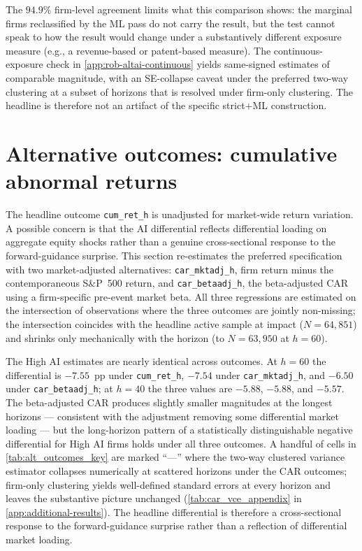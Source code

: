The $94.9\%$ firm-level agreement limits what this comparison shows:
the marginal firms reclassified by the ML pass do not carry the
result, but the test cannot speak to how the result would change
under a substantively different exposure measure (e.g., a
revenue-based or patent-based measure). The continuous-exposure check
in \cref{app:rob-altai-continuous} yields same-signed estimates of
comparable magnitude, with an SE-collapse caveat under the preferred
two-way clustering at a subset of horizons that is resolved under
firm-only clustering. The headline is therefore not an artifact of
the specific strict$+$ML construction.

\section{Alternative outcomes: cumulative abnormal returns}
\label{sec:rob-altoutcomes}

The headline outcome \texttt{cum\_ret\_h} is unadjusted for market-wide
return variation. A possible concern is that the AI differential
reflects differential loading on aggregate equity shocks rather than
a genuine cross-sectional response to the forward-guidance surprise.
This section re-estimates the preferred specification with two
market-adjusted alternatives: \texttt{car\_mktadj\_h}, firm return
minus the contemporaneous S\&P~500 return, and \texttt{car\_betaadj\_h},
the beta-adjusted CAR using a firm-specific pre-event market beta.
All three regressions are estimated on the intersection of
observations where the three outcomes are jointly non-missing; the
intersection coincides with the headline active sample at impact
($N = 64{,}851$) and shrinks only mechanically with the horizon (to
$N = 63{,}950$ at $h = 60$).

\begin{table}[htbp]
\centering\small
\caption[Alternative outcomes: key-horizon estimates]{Alternative
outcomes: key-horizon estimates}
\label{tab:alt_outcomes_key}

\end{table}

The High AI estimates are nearly identical across outcomes. At
$h = 60$ the differential is $-7.55$~pp under \texttt{cum\_ret\_h},
$-7.54$ under \texttt{car\_mktadj\_h}, and $-6.50$ under
\texttt{car\_betaadj\_h}; at $h = 40$ the three values are $-5.88$,
$-5.88$, and $-5.57$. The beta-adjusted CAR produces slightly smaller
magnitudes at the longest horizons --- consistent with the
adjustment removing some differential market loading --- but the
long-horizon pattern of a statistically distinguishable negative
differential for High AI firms holds under all three outcomes. A
handful of cells in \cref{tab:alt_outcomes_key} are marked ``---''
where the two-way clustered variance estimator collapses numerically
at scattered horizons under the CAR outcomes; firm-only clustering
yields well-defined standard errors at every horizon and leaves the
substantive picture unchanged
(\cref{tab:car_vce_appendix} in \cref{app:additional-results}). The
headline differential is therefore a cross-sectional response to the
forward-guidance surprise rather than a reflection of differential
market loading.

